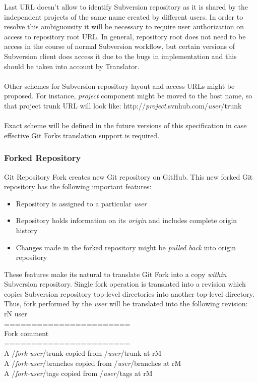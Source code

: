 Last URL doesn't allow to identify Subversion repository as it is shared by the independent projects of the same 
name created by different users. In order to resolve this ambiguousity it will be necessary to require user authorization
on access to repository root URL. In general, repository root does not need to be access in the course of normal
Subversion workflow, but certain versions of Subversion client does access it due to the bugs in implementation and this 
should be taken into account by Translator.\\\\
Other schemes for Subversion repository layout and access URLs might be proposed. For instance, \emph{project} component
might be moved to the host name, so that project trunk URL will look like: http://\emph{project}.svnhub.com/\emph{user}/trunk
\\\\
Exact scheme will be defined in the future versions of this specification in case effective Git Forks translation support 
is required.
\subsubsection{Forked Repository}
Git Repository Fork creates new Git repository on GitHub. This new forked Git repository has the following 
important features:
\begin{itemize}
\item Repository is assigned to a particular \emph{user}
\item Repository holds information on its \emph{origin} and includes complete origin history
\item Changes made in the forked repository might be \emph{pulled back} into origin repository
\end{itemize}

These features make its natural to translate Git Fork into a copy \emph{within} Subversion repository. Single fork 
operation is translated into a revision which copies Subversion repository top-level directories into another top-level directory. 
Thus, fork performed by the \emph{user} will be translated into the following revision:\\

rN user\\ 
=======================\\
Fork comment             \\
=======================\\
A /\emph{fork-user}/trunk copied from /\emph{user}/trunk at rM\\
A /\emph{fork-user}/branches copied from /\emph{user}/branches at rM\\
A /\emph{fork-user}/tags copied from /\emph{user}/tags at rM\\

